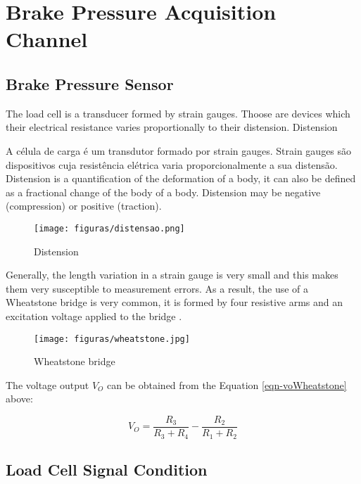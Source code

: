 \section{Brake Pressure Acquisition Channel}
			
	\subsection{Brake Pressure Sensor}
		
		The load cell is a transducer formed by strain gauges. Thoose are devices which their electrical resistance varies proportionally to their distension. Distension
		
		A célula de carga é um transdutor formado por strain gauges. Strain gauges são dispositivos cuja resistência elétrica varia proporcionalmente a sua distensão. Distension is a quantification of the deformation of a body, it can also be defined as a fractional change of the body of a body. Distension may be negative (compression) or positive (traction).

		\begin{figure}[htbp]
			\centering
				\texttt{[image: figuras/distensao.png]}
			\caption{Distension \cite{strain-def}}
			\label{fig-distension}
		\end{figure}

		Generally, the length variation in a strain gauge is very small and this makes them very susceptible to measurement errors. As a result, the use of a Wheatstone bridge is very common, it is formed by four resistive arms and an excitation voltage applied to the bridge \cite{window1982strain}.

		\begin{figure}[htbp]
			\centering
				\texttt{[image: figuras/wheatstone.jpg]}
			\caption{Wheatstone bridge \cite{wheat-bridge}}
			\label{fig-wheatstone}
		\end{figure}

		The voltage output $V_{O}$ can be obtained from the Equation \ref{eqn-voWheatstone} above:

		\begin{equation}\label{eqn-voWheatstone}
		V_{O}=\frac{ R_{3} }{ R_{3} + R_{4} } - \frac{ R_{2} }{ R_{1} + R_{2}}
		\end{equation}
	

	\subsection{Load Cell Signal Condition}
		
